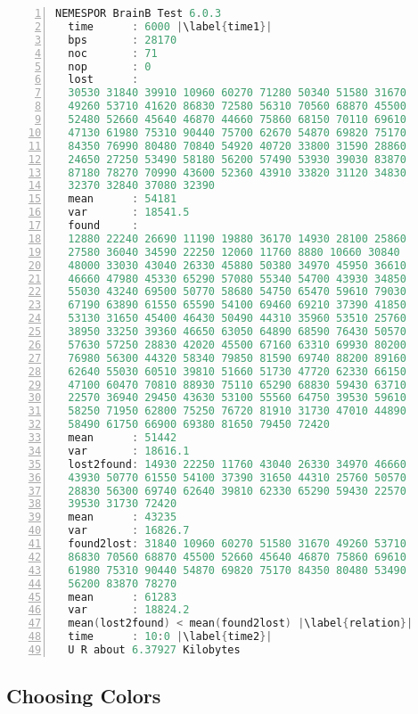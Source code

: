 \documentclass[a4paper]{article}
\begin{document}
\begin{lstlisting}[language={C},numbers={left},stepnumber={1},numbersep={-1pt},basicstyle={\scriptsize\ttfamily},caption={The structure of the measured data. This log file is belong to the measurement shown in Fig \ref{brainbs6nblog}.},label={savedata},escapechar={|}]
  NEMESPOR BrainB Test 6.0.3
  time      : 6000 |\label{time1}|
  bps       : 28170
  noc       : 71
  nop       : 0
  lost      : 
  30530 31840 39910 10960 60270 71280 50340 51580 31670 
  49260 53710 41620 86830 72580 56310 70560 68870 45500 
  52480 52660 45640 46870 44660 75860 68150 70110 69610 
  47130 61980 75310 90440 75700 62670 54870 69820 75170
  84350 76990 80480 70840 54920 40720 33800 31590 28860 
  24650 27250 53490 58180 56200 57490 53930 39030 83870 
  87180 78270 70990 43600 52360 43910 33820 31120 34830
  32370 32840 37080 32390 
  mean      : 54181
  var       : 18541.5
  found     : 
  12880 22240 26690 11190 19880 36170 14930 28100 25860 
  27580 36040 34590 22250 12060 11760 8880 10660 30840 
  48000 33030 43040 26330 45880 50380 34970 45950 36610 
  46660 47980 45330 65290 57080 55340 54700 43930 34850 
  55030 43240 69500 50770 58680 54750 65470 59610 79030 
  67190 63890 61550 65590 54100 69460 69210 37390 41850 
  53130 31650 45400 46430 50490 44310 35960 53510 25760 
  38950 33250 39360 46650 63050 64890 68590 76430 50570 
  57630 57250 28830 42020 45500 67160 63310 69930 80200 
  76980 56300 44320 58340 79850 81590 69740 88200 89160 
  62640 55030 60510 39810 51660 51730 47720 62330 66150 
  47100 60470 70810 88930 75110 65290 68830 59430 63710 
  22570 36940 29450 43630 53100 55560 64750 39530 59610 
  58250 71950 62800 75250 76720 81910 31730 47010 44890 
  58490 61750 66900 69380 81650 79450 72420 
  mean      : 51442
  var       : 18616.1
  lost2found: 14930 22250 11760 43040 26330 34970 46660 
  43930 50770 61550 54100 37390 31650 44310 25760 50570 
  28830 56300 69740 62640 39810 62330 65290 59430 22570
  39530 31730 72420 
  mean      : 43235
  var       : 16826.7
  found2lost: 31840 10960 60270 51580 31670 49260 53710 
  86830 70560 68870 45500 52660 45640 46870 75860 69610 
  61980 75310 90440 54870 69820 75170 84350 80480 53490 
  56200 83870 78270 
  mean      : 61283
  var       : 18824.2
  mean(lost2found) < mean(found2lost) |\label{relation}|
  time      : 10:0 |\label{time2}|
  U R about 6.37927 Kilobytes
\end{lstlisting}


\subsection{Choosing Colors}
\end{document}

